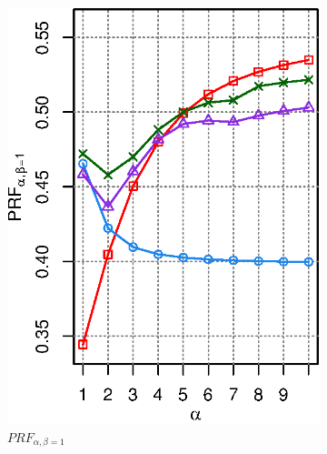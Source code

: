 \begin{figure}[H]
\centering
\caption{\PRF performance with different $\alpha$, $\beta$ settings for \QFI and \QFJ under \MLE and \EUM training on \DQF.  run result is reported for \EUM.}
\label{fig:qfi-qfj}
\begin{subfigure}[b]{0.45\columnwidth}
\includegraphics[width=\columnwidth]{figure/qf13-prfa-qfi-qfj.eps}
\caption{$P\!R\!F_{\alpha,\beta=1}$}
\end{subfigure}
\begin{subfigure}[b]{0.45\columnwidth}

\end{subfigure}
\end{figure}
